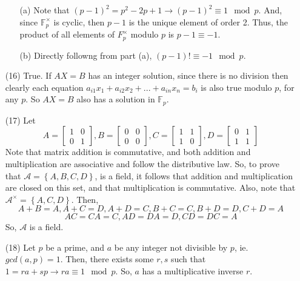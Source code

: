 \begin{itemize}
\begin{itemize}
\item[(a)]
Note that $(p - 1)^2 = p^2 - 2p + 1 \rightarrow (p - 1)^2 \equiv 1 \mod p$. And, since $\mathbb{F}_p^\times$ is cyclic, then $p - 1$ is the unique element of order 2. Thus, the product of all elements of $F_p^\times$ modulo $p$ is $p - 1 \equiv -1$.
\item[(b)]
Directly followng from part (a), $(p - 1)! \equiv -1 \mod p$.
\end{itemize}
\item[(16)]
True. If $AX = B$ has an integer solution, since there is no division then clearly each equation $a_{i1}x_1 + a_{i2}x_2 + ... + a_{in}x_n = b_i$ is also true modulo $p$, for any $p$. So $AX = B$ also has a solution in $\mathbb{F}_p$.
\item[(17)]
Let
$$A = \begin{bmatrix}
1 & 0 \\
0 & 1
\end{bmatrix}, B = \begin{bmatrix}
0 & 0 \\
0 & 0
\end{bmatrix}, C = \begin{bmatrix}
1 & 1 \\
1 & 0
\end{bmatrix}, D = \begin{bmatrix}
0 & 1 \\
1 & 1
\end{bmatrix}$$
Note that matrix addition is commutative, and both addition and multiplication are associative and follow the distributive law. So, to prove that $\mathcal{A} = \left\lbrace A, B, C, D \right\rbrace$, is a field, it follows that addition and multiplication are closed on this set, and that multiplication is commutative. Also, note that $\mathcal{A}^\times = \left\lbrace A, C, D \right\rbrace$.
Then,
$$A + B = A, A + C = D, A + D = C, B + C = C, B + D = D, C + D = A$$
$$AC = CA = C, AD = DA = D, CD = DC = A$$
So, $\mathcal{A}$ is a field.
\item[(18)]
Let $p$ be a prime, and $a$ be any integer not divisible by $p$, ie. $gcd(a, p) = 1$. Then, there exists some $r, s$ such that $1 = ra + sp \rightarrow ra \equiv 1 \mod p$. So, $a$ has a multiplicative inverse $r$.
\end{itemize}
%
